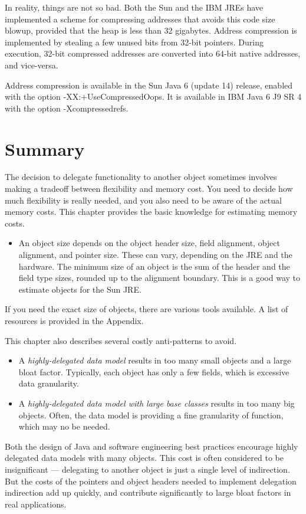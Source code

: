 In reality, things are not so bad. Both the Sun and the IBM JREs have implemented a scheme for compressing addresses that avoids this code size blowup, provided that the heap is less than 32 gigabytes. Address compression is implemented by stealing a few unused bits from 32-bit pointers. During execution, 32-bit compressed addresses are converted into 64-bit native addresses, and vice-versa. 

Address compression is available in the Sun Java 6 (update 14) release, enabled with the option -XX:+UseCompressedOops. It is available in IBM Java 6 J9 SR 4 with the option -Xcompressedrefs.

\section{Summary}

The decision to delegate functionality to another object sometimes involves making a tradeoff between flexibility and memory cost. You need to decide how much flexibility is really needed, and you also need to be aware of the actual memory costs. This chapter provides the basic knowledge for estimating memory costs. 
\begin{itemize}
\item An object size depends on the object header size, field alignment, object alignment, and pointer size. These can vary, depending on the JRE and the hardware. The minimum size of an object is the sum of the header and the field type sizes, rounded up to the alignment boundary. This is a good way to estimate objects for the Sun JRE.
\end{itemize}
If you need the exact size of objects, there are various tools available. A list of resources is provided in the Appendix.

This chapter also describes several costly anti-patterns to avoid.
\begin{itemize}
\item A \textit{highly-delegated data model} results in too many small objects and a large bloat factor. Typically, each object has only a few fields, which is excessive data granularity.  
\item A \textit{highly-delegated data model with large base classes} results in too many big objects. Often, the data model is providing a fine granularity of function, which may no be needed.
\end{itemize}   

Both the design of Java and software engineering best practices encourage highly delegated data models with many objects. This cost is often considered to be insignificant --- delegating to another object is just a single level of indirection. But the costs of the pointers and object headers needed to implement delegation indirection add up quickly, and contribute significantly to large bloat factors in real applications. 

  

